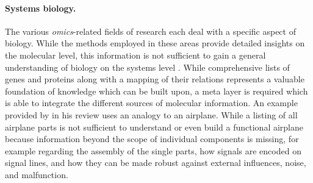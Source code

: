 
\paragraph{Systems biology.}

The various {\em omics}-related fields of research each deal
with a specific aspect of biology.
While the methods employed in these areas provide detailed insights on the 
molecular level, this information is not sufficient to gain a general 
understanding of biology on the systems level \citep{Kitano2002}.
While comprehensive lists of genes and proteins along with a mapping
of their relations represents a valuable foundation of knowledge which can
be built upon, a meta layer is required which is able to integrate the
different sources of molecular information.
An example provided by \citeauthor{Kitano2002} in his review uses an analogy 
to an airplane.
While a listing of all airplane parts is not sufficient to understand or even
build a functional airplane because information beyond the scope of individual
components is missing, for example regarding the assembly of the single parts,
how signals are encoded on signal lines, and how they can be made robust against
external influences, noise, and malfunction.

